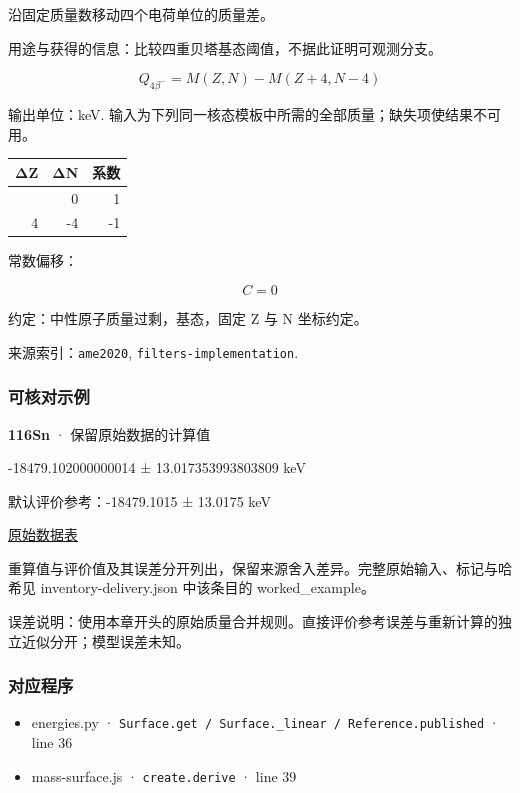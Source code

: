\documentclass[
  11pt,
  letterpaper,
]{article}
\providecommand{\tightlist}{%
  \setlength{\itemsep}{0pt}\setlength{\parskip}{0pt}}
\begin{document}
沿固定质量数移动四个电荷单位的质量差。

用途与获得的信息：比较四重贝塔基态阈值，不据此证明可观测分支。

\[
Q_{4\beta^-}=M(Z,N)-M(Z+4,N-4)
\]

输出单位：keV.
输入为下列同一核态模板中所需的全部质量；缺失项使结果不可用。

\begin{longtable}[]{@{}rrr@{}}
\toprule\noalign{}
ΔZ & ΔN & 系数 \\
\midrule\noalign{}
\endhead
\bottomrule\noalign{}
\endlastfoot
0 & 0 & 1 \\
4 & -4 & -1 \\
\end{longtable}

常数偏移：

\[
C=0
\]

约定：中性原子质量过剩，基态，固定 Z 与 N 坐标约定。

来源索引：\texttt{ame2020}, \texttt{filters-implementation}.

\subsubsection{可核对示例}\label{ux53efux6838ux5bf9ux793aux4f8b-14}

\textbf{116Sn} · 保留原始数据的计算值

-18479.102000000014 ± 13.017353993803809 keV

默认评价参考：-18479.1015 ± 13.0175 keV

\href{https://www-nds.iaea.org/amdc/ame2020/rct2_1.mas20.txt}{原始数据表}

重算值与评价值及其误差分开列出，保留来源舍入差异。完整原始输入、标记与哈希见
inventory-delivery.json 中该条目的 worked\_example。

误差说明：使用本章开头的原始质量合并规则。直接评价参考误差与重新计算的独立近似分开；模型误差未知。

\subsubsection{对应程序}\label{ux5bf9ux5e94ux7a0bux5e8f-14}

\begin{itemize}
\tightlist
\item
  energies.py ·
  \texttt{Surface.get\ /\ Surface.\_linear\ /\ Reference.published} ·
  line 36
\item
  mass-surface.js · \texttt{create.derive} · line 39
\end{itemize}
\end{document}
